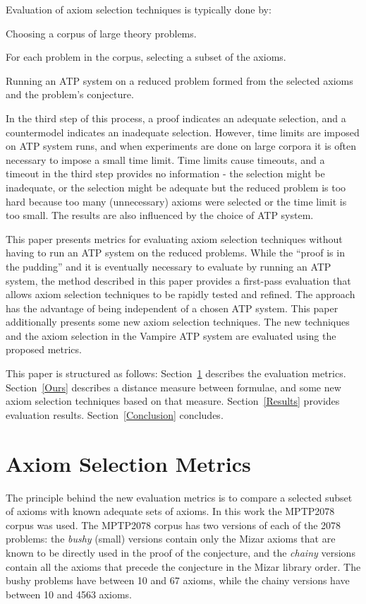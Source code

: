 \documentclass[EPiC]{easychair}
\newenvironment{packed_enumerate}{
\vspace*{-0.5em}
\begin{enumerate}
  \setlength{\partopsep}{0pt}
  \setlength{\itemsep}{1pt}
  \setlength{\parskip}{0pt}
  \setlength{\parsep}{0pt}
}{\end{enumerate}}
\begin{document}
Evaluation of axiom selection techniques is typically done by:
\begin{packed_enumerate}
\item Choosing a corpus of large theory problems.
\item For each problem in the corpus, selecting a subset of the axioms.
\item Running an ATP system on a reduced problem formed from the selected 
      axioms and the problem's conjecture.
\end{packed_enumerate}
In the third step of this process, a proof indicates an adequate selection,
and a countermodel indicates an inadequate selection. 
However, time limits are imposed on ATP system runs, and when experiments 
are done on large corpora it is often necessary to impose a small time limit.
Time limits cause timeouts, and a timeout in the third step provides no 
information - the selection might be inadequate, or the selection might be 
adequate but the reduced problem is too hard because too many (unnecessary) 
axioms were selected or the time limit is too small.
The results are also influenced by the choice of ATP system.

This paper presents metrics for evaluating axiom selection techniques
without having to run an ATP system on the reduced problems.
While the ``proof is in the pudding'' and it is eventually necessary to
evaluate by running an ATP system, the method described in this paper
provides a first-pass evaluation that allows axiom selection techniques to
be rapidly tested and refined.
The approach has the advantage of being independent of a chosen ATP system.
This paper additionally presents some new axiom selection techniques. 
The new techniques and the axiom selection in the Vampire \cite{KV13} 
ATP system are evaluated using the proposed metrics.

This paper is structured as follows:
Section~\ref{Metrics} describes the evaluation metrics.
Section~\ref{Ours} describes a distance measure between formulae, and
some new axiom selection techniques based on that measure.
Section~\ref{Results} provides evaluation results.
Section~\ref{Conclusion} concludes.

\section{Axiom Selection Metrics}
\label{Metrics}

The principle behind the new evaluation metrics is to compare a selected
subset of axioms with known adequate sets of axioms.
In this work the MPTP2078 corpus was used.
The MPTP2078 corpus has two versions of each of the 2078 problems: 
the \emph{bushy} (small) versions contain only the Mizar axioms that are
known to be directly used in the proof of the conjecture, and 
the \emph{chainy} versions contain all the axioms that precede the conjecture
in the Mizar library order.
The bushy problems have between 10 and 67 axioms, while the chainy versions
have between 10 and 4563 axioms.
\end{document}
